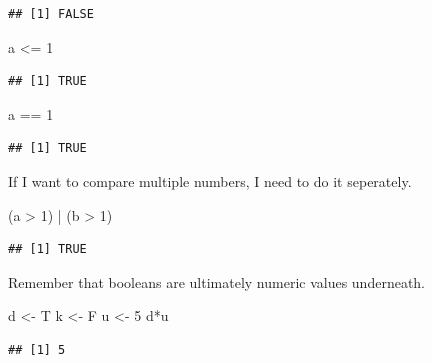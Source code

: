 \documentclass[
]{book}
\newenvironment{Shaded}{\begin{snugshade}}{\end{snugshade}}
\newcommand{\DecValTok}[1]{\textcolor[rgb]{0.00,0.00,0.81}{#1}}
\newcommand{\NormalTok}[1]{#1}
\newcommand{\OtherTok}[1]{\textcolor[rgb]{0.56,0.35,0.01}{#1}}
\newcommand{\SpecialCharTok}[1]{\textcolor[rgb]{0.00,0.00,0.00}{#1}}
\begin{document}
\begin{verbatim}
## [1] FALSE
\end{verbatim}

\begin{Shaded}
\begin{Highlighting}[]
\NormalTok{a }\SpecialCharTok{\textless{}=} \DecValTok{1}
\end{Highlighting}
\end{Shaded}

\begin{verbatim}
## [1] TRUE
\end{verbatim}

\begin{Shaded}
\begin{Highlighting}[]
\NormalTok{a }\SpecialCharTok{==} \DecValTok{1}
\end{Highlighting}
\end{Shaded}

\begin{verbatim}
## [1] TRUE
\end{verbatim}

If I want to compare multiple numbers, I need to do it seperately.

\begin{Shaded}
\begin{Highlighting}[]
\NormalTok{(a }\SpecialCharTok{\textgreater{}} \DecValTok{1}\NormalTok{) }\SpecialCharTok{|}\NormalTok{ (b }\SpecialCharTok{\textgreater{}} \DecValTok{1}\NormalTok{)}
\end{Highlighting}
\end{Shaded}

\begin{verbatim}
## [1] TRUE
\end{verbatim}

Remember that booleans are ultimately numeric values underneath.

\begin{Shaded}
\begin{Highlighting}[]
\NormalTok{d }\OtherTok{\textless{}{-}}\NormalTok{ T}
\NormalTok{k }\OtherTok{\textless{}{-}}\NormalTok{ F}
\NormalTok{u }\OtherTok{\textless{}{-}} \DecValTok{5}
\NormalTok{d}\SpecialCharTok{*}\NormalTok{u}
\end{Highlighting}
\end{Shaded}

\begin{verbatim}
## [1] 5
\end{verbatim}
\end{document}
